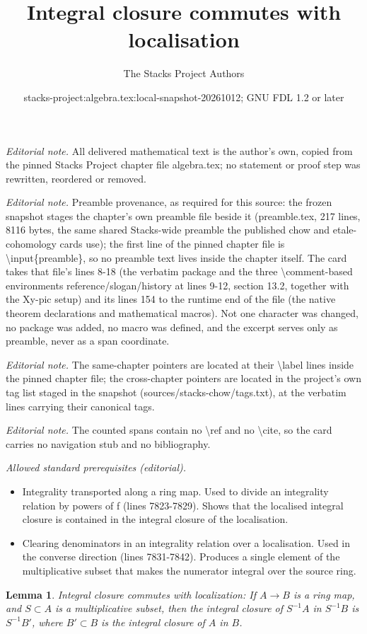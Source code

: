 \documentclass[10pt,a4paper]{amsart}
\title{Integral closure commutes with localisation}
\author{The Stacks Project Authors}
\date{stacks-project:algebra.tex:local-snapshot-20261012; GNU FDL 1.2 or later}
\theoremstyle{plain}
\newtheorem{lemma}[subsection]{Lemma}
\theoremstyle{definition}
\theoremstyle{remark}
\numberwithin{equation}{subsection}
\begin{document}
\maketitle
\noindent\textit{Editorial note.} All delivered mathematical text is the author's own, copied from the pinned Stacks Project chapter file algebra.tex; no statement or proof step was rewritten, reordered or removed.\par\medskip
\noindent\textit{Editorial note.} Preamble provenance, as required for this source: the frozen snapshot stages the chapter's own preamble file beside it (preamble.tex, 217 lines, 8116 bytes, the same shared Stacks-wide preamble the published chow and etale-cohomology cards use); the first line of the pinned chapter file is \textbackslash{}input\{preamble\}, so no preamble text lives inside the chapter itself. The card takes that file's lines 8-18 (the verbatim package and the three \textbackslash{}comment-based environments reference/slogan/history at lines 9-12, section 13.2, together with the Xy-pic setup) and its lines 154 to the runtime end of the file (the native theorem declarations and mathematical macros). Not one character was changed, no package was added, no macro was defined, and the excerpt serves only as preamble, never as a span coordinate.\par\medskip
\noindent\textit{Editorial note.} The same-chapter pointers are located at their \textbackslash{}label lines inside the pinned chapter file; the cross-chapter pointers are located in the project's own tag list staged in the snapshot (sources/stacks-chow/tags.txt), at the verbatim lines carrying their canonical tags.\par\medskip
\noindent\textit{Editorial note.} The counted spans contain no \textbackslash{}ref and no \textbackslash{}cite, so the card carries no navigation stub and no bibliography.\par\medskip
\noindent\textit{Allowed standard prerequisites (editorial).}\begin{itemize}
\item Integrality transported along a ring map. Used to divide an integrality relation by powers of f (lines 7823-7829). Shows that the localised integral closure is contained in the integral closure of the localisation.
\item Clearing denominators in an integrality relation over a localisation. Used in the converse direction (lines 7831-7842). Produces a single element of the multiplicative subset that makes the numerator integral over the source ring.
\end{itemize}\medskip
\begin{lemma}
\label{lemma-integral-closure-localize}
Integral closure commutes with localization: If $A \to B$ is a ring
map, and $S \subset A$ is a multiplicative subset, then the integral
closure of $S^{-1}A$ in $S^{-1}B$ is $S^{-1}B'$, where $B' \subset B$
is the integral closure of $A$ in $B$.
\end{lemma}
\end{document}
